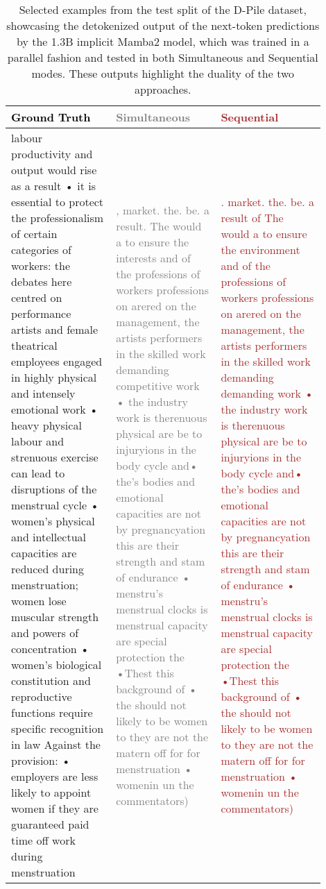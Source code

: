 \begin{table}[ht]  
\centering  
\caption{Selected examples from the test split of the D-Pile dataset, showcasing the detokenized output of the next-token predictions by the 1.3B implicit Mamba2 model, which was trained in a parallel fashion and tested in both Simultaneous and Sequential modes. These outputs highlight the duality of the two approaches.} 
\begin{tabular}{p{0.3\linewidth}|p{0.3\linewidth}|p{0.3\linewidth}}  
\hline  
\textbf{\textcolor{black}{Ground Truth}}&
\textbf{\textcolor{gray}{Simultaneous}} & \textbf{\textcolor{brown}{Sequential}} \\  
\hline  
    labour productivity and output would rise as a result • it is essential to protect the professionalism of certain categories of workers: the debates here centred on performance artists and female theatrical employees engaged in highly physical and intensely emotional work • heavy physical labour and strenuous exercise can lead to disruptions of the menstrual cycle • women’s physical and intellectual capacities are reduced during menstruation; women lose muscular strength and powers of concentration • women’s biological constitution and reproductive functions require specific recognition in law  Against the provision: • employers are less likely to appoint women if they are guaranteed paid time off work during menstruation &
\textcolor{gray}{, market. the. be. a result.  The would a to ensure the interests and of the professions of workers   professions on arered on the management, the artists performers  in the skilled work demanding competitive work • the industry work is therenuous physical are be to injuryions in the body cycle and• the’s bodies and emotional capacities are not by pregnancyation  this are their strength and stam of endurance • menstru’s menstrual clocks is menstrual capacity are special protection  the •Thest this background of • the should not likely to be women to they are not the matern off for for menstruation • womenin un the commentators) }&
\textcolor{brown}{. market. the. be. a result of  The would a to ensure the environment and of the professions of workers   professions on arered on the management, the artists performers  in the skilled work demanding demanding work • the industry work is therenuous physical are be to injuryions in the body cycle and• the’s bodies and emotional capacities are not by pregnancyation  this are their strength and stam of endurance • menstru’s menstrual clocks is menstrual capacity are special protection  the •Thest this background of • the should not likely to be women to they are not the matern off for for menstruation • womenin un the commentators)}


\end{tabular}
\end{table}
